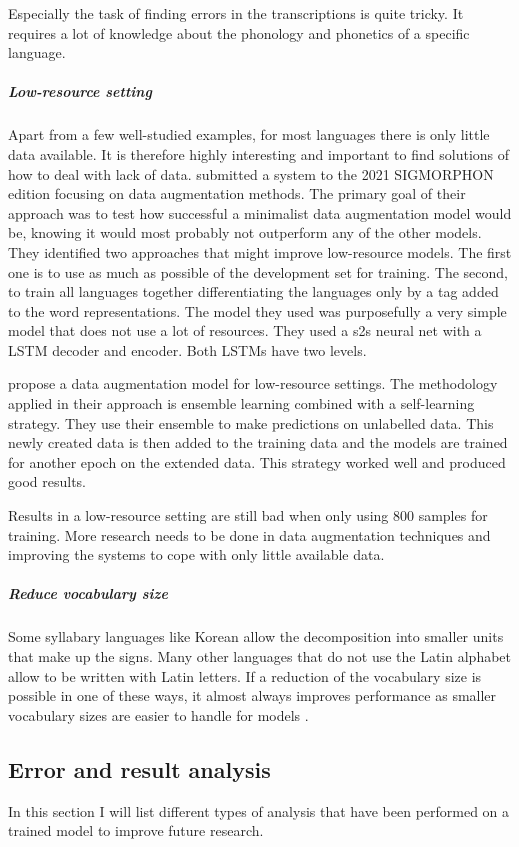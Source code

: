 Especially the task of finding errors in the transcriptions is quite tricky. It requires a lot of knowledge about the phonology and phonetics of a specific language. 

\subparagraph{Low-resource setting}
Apart from a few well-studied examples, for most languages there is only little data available. It is therefore highly interesting and important to find solutions of how to deal with lack of data. \cite{hammond-2021-data} submitted a system to the 2021 SIGMORPHON edition focusing on data augmentation methods. The primary goal of their approach was to test how successful a minimalist data augmentation model would be, knowing it would most probably not outperform any of the other models. They identified two approaches that might improve low-resource models. The first one is to use as much as possible of the development set for training. The second, to train all languages together differentiating the languages only by a tag added to the word representations. The model they used was purposefully a very simple model that does not use a lot of resources. They used a \ac{s2s} neural net with a LSTM decoder and encoder. Both LSTMs have two levels. 

\citet{yu-etal-2020} propose a data augmentation model for low-resource settings. The methodology applied in their approach is ensemble learning combined with a self-learning strategy. They use their ensemble to make predictions on unlabelled data. This newly created data is then added to the training data and the models are trained for another epoch on the extended data. This strategy worked well and produced good results. 

Results in a low-resource setting are still bad when only using 800 samples for training. More research needs to be done in data augmentation techniques and improving the systems to cope with only little available data.

\subparagraph{Reduce vocabulary size}
Some syllabary languages like Korean allow the decomposition into smaller units that make up the signs. Many other languages that do not use the Latin alphabet allow to be written with Latin letters. If a reduction of the vocabulary size is possible in one of these ways, it almost always improves performance as smaller vocabulary sizes are easier to handle for models \citep{gorman-etal-2020-sigmorphon}. 


\subsection{Error and result analysis}
In this section I will list different types of analysis that have been performed on a trained model to improve future research.

